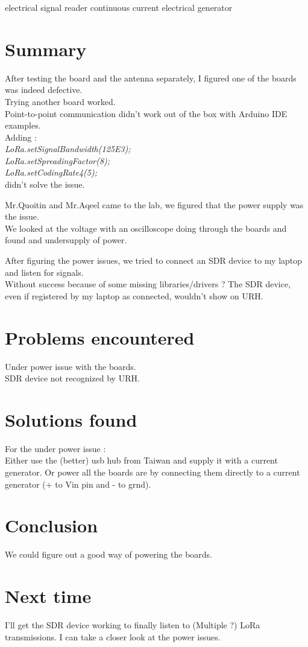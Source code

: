 \documentclass[a4paper, 12pt]{article}
\begin{document}
electrical signal reader
continuous current electrical generator 

\section{Summary}
After testing the board and the antenna separately, I figured one of the boards was indeed defective.\\ Trying another board worked. \\
Point-to-point communication didn't work out of the box with Arduino IDE examples.\\ Adding : \\
\emph{
LoRa.setSignalBandwidth(125E3); \\
LoRa.setSpreadingFactor(8);  \\
LoRa.setCodingRate4(5);}\\
didn't solve the issue.

Mr.Quoitin and Mr.Aqeel came to the lab, we figured that the power supply was the issue.\\
We looked at the voltage with an oscilloscope doing through the boards and found and undersupply of power. 

After figuring the power issues, we tried to connect an SDR device to my laptop and listen for signals.\\
Without success because of some missing libraries/drivers ?
The SDR device, even if registered by my laptop as connected, wouldn't show on URH.


\section{Problems encountered} 
Under power issue with the boards.\\
SDR device not recognized by URH.

\section{Solutions found}
For the under power issue :\\
Either use the (better) usb hub from Taiwan and supply it with a current generator.
Or power all the boards are by connecting them directly to a current generator (+ to Vin pin and - to grnd).

\section{Conclusion}
We could figure out a good way of powering the boards.


\section{Next time}
I'll get the SDR device working to finally listen to (Multiple ?) LoRa transmissions.
I can take a closer look at the power issues.
\end{document}
